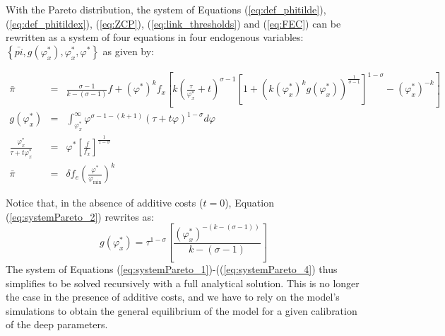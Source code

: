\documentclass[a4paper,11pt]{article}
\begin{document}
With the Pareto distribution, the system of Equations (\ref{eq:def_phitilde}), (\ref{eq:def_phitildex}), (\ref{eq:ZCP}), (\ref{eq:link_thresholds}) and (\ref{eq:FEC}) can be rewritten as a system of four equations in four endogenous variables: $\left\{\bar{pi}, g(\varphi_x^\ast),\varphi_x^\ast, \varphi^\ast  \right\}$ as given by:

\begin{eqnarray}
\bar{\pi}&=& \frac{\sigma-1}{k-(\sigma-1)}f + \left(\varphi^\ast \right)^k f_x\left[k\left(\frac{\tau}{\varphi_x^\ast}+t  \right)^{\sigma-1}\left[  1+(k(\varphi_x^\ast)^k g(\varphi_x^\ast))^{\frac{1}{\sigma-1}}\right]^{1-\sigma}  - \left( \varphi_x^\ast \right)^{-k} \right] \label{eq:systemPareto_1}\\
g(\varphi_x^\ast)&=&\int_{\varphi_x^\ast}^\infty \varphi^{\sigma-1-(k+1)}(\tau +t\varphi)^{1-\sigma}d\varphi \label{eq:systemPareto_2}\\
\frac{\varphi_x^\ast}{\tau+ t\varphi_x^\ast}&=&\varphi^\ast \left[ \frac{f}{f_x} \right]^{\frac{1}{1-\sigma}} \label{eq:systemPareto_3}\\
\bar{\pi}&=& \delta f_e \left( \frac{\varphi^\ast}{\varphi_{\text{min}}} \right)^k \label{eq:systemPareto_4}
\end{eqnarray}

Notice that, in the absence of additive costs ($t=0$), Equation (\ref{eq:systemPareto_2}) rewrites as:
$$g(\varphi_x^\ast) = \tau^{1-\sigma}\left[ \frac{(\varphi_x^\ast)^{-(k-(\sigma-1))}}{k-(\sigma-1)}\right]$$
The system of Equations (\ref{eq:systemPareto_1})-((\ref{eq:systemPareto_4}) thus simplifies to be solved recursively with a full analytical solution. This is no longer the case in the presence of additive costs, and we have to rely on the model's simulations to obtain the general equilibrium of the model for a given calibration of the deep parameters.
\end{document}
